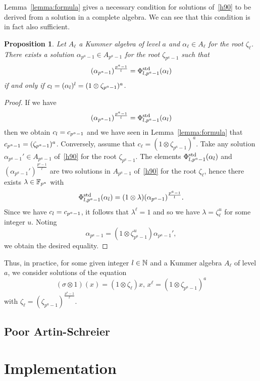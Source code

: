 \documentclass{sig-alternate}
\newtheorem{proposition}[theorem]{Proposition}
\begin{document}
Lemma~\ref{lemma:formula} gives a necessary condition for solutions of~\eqref{h90}
to be derived from a solution in a complete algebra. We can see that this condition is in fact
also sufficient.
\begin{proposition}
  Let $A_\ell$ a Kummer algebra of level $a$ and $\alpha_\ell\in A_\ell$ for the
  root $\zeta_\ell$. There exists a solution $\alpha_{p^a-1}\in A_{p^a-1}$ for
  the root $\zeta_{p^a-1}$ such that
  \[
    (\alpha_{p^a-1})^{\frac{p^a-1}{l}}={\Phi^{\textrm{std}}_{{l},{p^a-1}}}(\alpha_l)
  \]
  if and only if $c_l = (\alpha_{l})^{l} = (1\otimes\zeta_{p^a-1})^a$.
\end{proposition}
\begin{proof}
 If we have  
  \[
    (\alpha_{p^a-1})^{\frac{p^a-1}{l}}={\Phi^{\textrm{std}}_{{l},{p^a-1}}}(\alpha_l)
  \]
  then we obtain $c_{l} = c_{p^a-1}$ and we have seen in
  Lemma~\ref{lemma:formula} that $c_{p^a-1}=(\zeta_{p^a-1})^a$. Conversely,
  assume that $c_\ell = (1\otimes\zeta_{p^a-1})^a$. Take any solution
  $\alpha_{p^a-1}'\in A_{p^a-1}$ of~\eqref{h90} for the root $\zeta_{p^a-1}$.
  The elements ${\Phi^{\textrm{std}}_{{l},{p^a-1}}}(\alpha_l)$ and
  $(\alpha_{p^a-1}')^{\frac{p^a-1}{\ell}}$ are two solutions in $A_{p^a-1}$
  of~\eqref{h90} for the root $\zeta_{\ell}$, hence there exists
  $\lambda\in\mathbb{F}_{p^a}$ with
  \[
    {\Phi^{\textrm{std}}_{{l},{p^a-1}}}(\alpha_l) =
    (1\otimes\lambda)(\alpha_{p^a-1})^{\frac{p^a-1}{l}}.
  \]
  Since we have $c_l = c_{p^a-1}$, it follows that $\lambda^\ell = 1$ and
  so we have $\lambda=\zeta_{\ell}^u$ for some integer $u$. Noting
  \[
    \alpha_{p^a-1} = (1\otimes\zeta_{p^a-1}^u)\alpha_{p^a-1}',
  \]
  we obtain the desired equality.
\end{proof}

Thus, in practice, for some given integer
$l\in\mathbb{N}$ and a Kummer algebra $A_\ell$ of level $a$, we consider solutions of the
equation
\begin{equation}
  \tag{H90$^\star$}
  (\sigma\otimes1)(x) = (1\otimes\zeta_\ell)x,\,x^\ell =
  (1\otimes\zeta_{p^a-1})^a
  \label{h90s}
\end{equation}
with $\zeta_\ell=(\zeta_{p^a-1})^{\frac{p^a-1}{\ell}}$.

\subsection{Poor Artin-Schreier}




\section{Implementation}
\label{sec:implementation}



\end{document}

